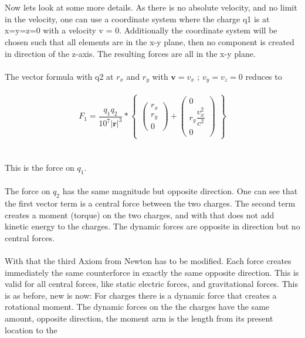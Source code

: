 \documentclass[10pt,titlepage]{article}
\begin{document}
\\
\\
Now lets look at some more details.
As there is no absolute velocity, and no limit in the velocity, one can use a coordinate system where the charge q1 is at x=y=z=0 with a velocity v = 0.
Additionally the coordinate system will be chosen such that all elements are in the x-y plane, then no component is created in direction of the z-axis. The resulting forces are all in the x-y plane.
\\
\\
The vector formula with q2 at $r_x$  and  $r_y$ with $ \textbf{v} = v_x $ ; $v_y=v_z=0$  reduces to
\\
\\
\begin{equation}
\textbf{$F_1$}=\dfrac{q_1q_2}{10^7\vert\textbf{r}\vert^3}*
\begin{Bmatrix}
\begin{pmatrix}r_x \\ r_y\\0\end{pmatrix}+
\begin{pmatrix}0 \\	r_y\dfrac{v_x^2}{c^2} \\0\end{pmatrix}
\end{Bmatrix}
\end{equation}
\\
\\
This is the force on $q_1$.
\\
\\
The force on $  q_2$ has the same magnitude but opposite direction.
One can see that the first vector term is a central force between the two charges.
The second term creates a moment (torque) on the two charges, and with that does not add kinetic energy to the charges. The dynamic forces are opposite in direction but no central forces. 
\\
\\
With that the third Axiom from Newton has to be modified. Each force creates immediately the same counterforce in exactly the same opposite direction. This is valid for all central forces, like static electric forces, and gravitational forces. This is as before, new is now:
For charges there is a dynamic force that creates a rotational moment. The dynamic forces on the the charges have the same amount, opposite direction, the moment arm is the length from its present location to the 
\\
\end{document}
